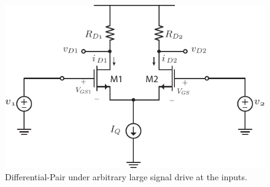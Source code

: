\begin{figure}[tb]
\begin{center}
\includegraphics[scale=1]{Diffamp_large_signal.pdf}
\end{center}
\caption{Differential-Pair under arbitrary large signal drive at the inputs.} \label{fig:Diff_amp_large.pdf}
\end{figure}

